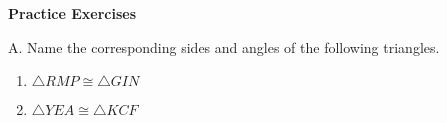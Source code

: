 \textbf{Practice Exercises}

\vspce

A. Name the corresponding sides and angles of the following triangles. 

\begin{enumerate}[label = \arabic*. ]
\item $\bigtriangleup RMP\cong \bigtriangleup GIN$
\item $\bigtriangleup YEA\cong \bigtriangleup KCF$

\end{enumerate} 
 
